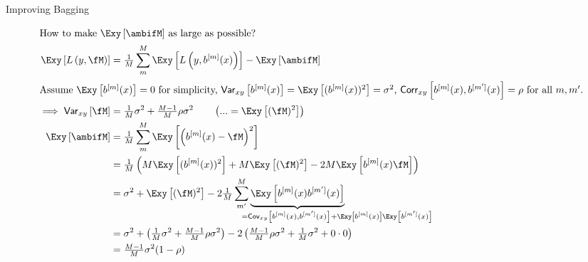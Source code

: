 \begin{vbframe}{Improving Bagging}
\begin{scriptsize}
\begin{align*}
\shortintertext{How to make $\Exy\left[\ambifM\right]$ as large as possible?}
\Exy\left[L\left(y, \fM \right)\right] &= \tfrac{1}{M}\sum^M_{m} \Exy\left[L\left(y, \blm \right)\right] - \Exy\left[\ambifM\right] \\
\shortintertext{Assume $\Exy\left[\blm\right] = 0$ for simplicity, $\var_{xy}\left[\blm\right] = \Exy\left[(\blm)^2\right] = \sigma^2$, $\corr_{xy}\left[\blm, \bl{m'}\right] = \rho$ for all $m, m'$.}
\implies 
\var_{xy}\left[\fM\right] &= \tfrac{1}{M} \sigma^2 +  \tfrac{M-1}{M} \rho \sigma^2 \qquad\left(... = \Exy\left[(\fM)^2\right]\right)\\
 \Exy\left[\ambifM\right] &= \tfrac{1}{M}\sum^M_{m} \Exy\left[\left(\blm- \fM\right)^2\right]\\
 & = \tfrac{1}{M}\left(M \Exy\left[(\blm)^2\right] + M \Exy\left[(\fM)^2\right] - 
     2 M \Exy\left[\blm\fM\right]\right) \\
  & = \sigma^2  + \Exy\left[(\fM)^2\right] - 2 \tfrac{1}{M}\sum^M_{m'} \underbrace{\Exy\left[\blm \bl{m'} \right]}_{\mathclap{\qquad\qquad\qquad\qquad= \cov_{xy}\left[\blm, \bl{m'} \right] + \Exy\left[\blm\right]\Exy\left[\bl{m'}\right]}} \\
  &=  \sigma^2  + \left(\tfrac{1}{M} \sigma^2 +   \tfrac{M-1}{M} \rho \sigma^2\right) - 2\left(\tfrac{M-1}{M} \rho\sigma^2 + \tfrac{1}{M}\sigma^2 + 0 \cdot 0 \right)\\
  &= \tfrac{M-1}{M} \sigma^2 (1-\rho)
\end{align*}
\end{scriptsize}


\end{vbframe}
